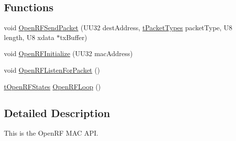 \subsection*{Functions}
\begin{DoxyCompactItemize}
\item 
void \hyperlink{group___open_r_f_ga7ada26870c6e5d53afb9e7502d39d841}{Open\-R\-F\-Send\-Packet} (U\-U32 dest\-Address, \hyperlink{group___radio_gaba81c4c5fad7e2e0cef01f8e6c710ecb}{t\-Packet\-Types} packet\-Type, U8 length, U8 xdata $\ast$tx\-Buffer)
\item 
void \hyperlink{group___open_r_f_gad11ed9e6c914c9c721219049f9a0d8b4}{Open\-R\-F\-Initialize} (U\-U32 mac\-Address)
\item 
void \hyperlink{group___open_r_f_gad0df82f0e17ad95bd30d5b82f59f8a71}{Open\-R\-F\-Listen\-For\-Packet} ()
\item 
\hyperlink{group___open_r_f_ga0191e76d54bb003723263a47fa9a7101}{t\-Open\-R\-F\-States} \hyperlink{group___open_r_f_ga66e3018afaf75239d092833054be068f}{Open\-R\-F\-Loop} ()
\end{DoxyCompactItemize}


\subsection{Detailed Description}
This is the Open\-R\-F M\-A\-C A\-P\-I. 

